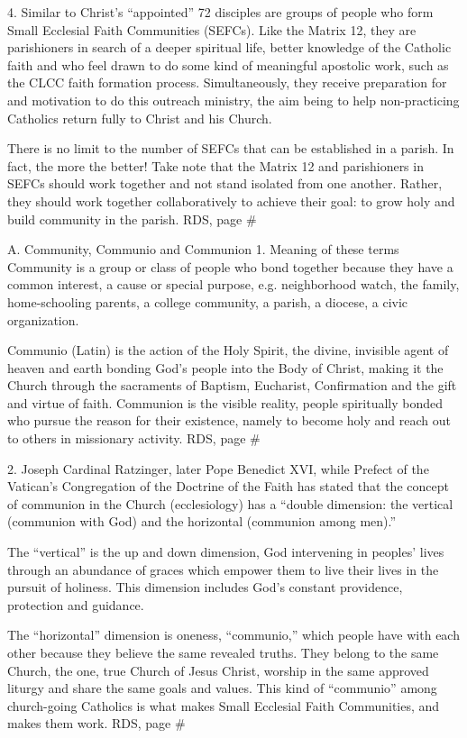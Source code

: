 \documentclass[oneside]{book}
\begin{document}
4. Similar to Christ's ``appointed'' 72 disciples are groups of people who form
Small Ecclesial Faith Communities (SEFCs). Like the Matrix 12, they are
parishioners in search of a deeper spiritual life, better knowledge of the
Catholic faith and who feel drawn to do some kind of meaningful apostolic work,
such as the CLCC faith formation process. Simultaneously, they receive
preparation for and motivation to do this outreach ministry, the aim being to
help non-practicing Catholics return fully to Christ and his Church.

There is no limit to the number of SEFCs that can be established in a parish. In
fact, the more the better! Take note that the Matrix 12 and parishioners in
SEFCs should work together and not stand isolated from one another. Rather, they
should work together collaboratively to achieve their goal: to grow holy and
build community in the parish.
RDS, page \#

A. Community, Communio and Communion
1. Meaning of these terms
Community is a group or class of people who bond together because they have a
common interest, a cause or special purpose, e.g. neighborhood watch, the
family, home-schooling parents, a college community, a parish, a diocese, a
civic organization.

Communio (Latin) is the action of the Holy Spirit, the divine, invisible agent
of heaven and earth bonding God's people into the Body of Christ, making it the
Church through the sacraments of Baptism, Eucharist, Confirmation and the gift
and virtue of faith.
Communion is the visible reality, people spiritually bonded who pursue the
reason for their existence, namely to become holy and reach out to others in
missionary activity.
RDS, page \#

2. Joseph Cardinal Ratzinger, later Pope Benedict XVI, while Prefect of the
Vatican's Congregation of the Doctrine of the Faith has stated that the concept
of communion in the Church (ecclesiology) has a ``double dimension: the vertical
(communion with God) and the horizontal (communion among men).''

The ``vertical'' is the up and down dimension, God intervening in peoples' lives
through an abundance of graces which empower them to live their lives in the
pursuit of holiness. This dimension includes God's constant providence,
protection and guidance.

The ``horizontal'' dimension is oneness, ``communio,'' which people have with
each other because they believe the same revealed truths. They belong to the
same Church, the one, true Church of Jesus Christ, worship in the same approved
liturgy and share the same goals and values. This kind of ``communio'' among
church-going Catholics is what makes Small Ecclesial Faith Communities, and
makes them work.
RDS, page \#
\end{document}
